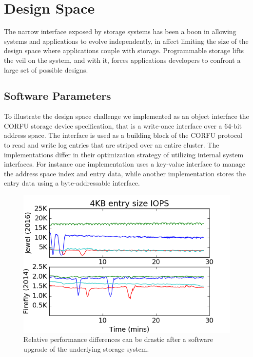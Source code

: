 \section{Design Space}
\label{sec:dspace}

The narrow interface exposed by storage systems has been a boon in allowing
systems and applications to evolve independently, in affect limiting the size
of the design space where applications couple with storage. Programmable
storage lifts the veil on the system, and with it, forces applications developers
to confront a large set of possible designs.

\subsection{Software Parameters}

To illustrate the design space challenge we implemented as an object interface
the CORFU storage device specification, that is a write-once interface over a
64-bit address space. The interface is used as a building block of the CORFU
protocol to read and write log entries that are striped over an entire
cluster.  The implementations differ in their optimization strategy of
utilizing internal system interfaces. For instance one implementation uses a
key-value interface to manage the address space index and entry data, while
another implementation stores the entry data using a byte-addressable
interface.

\begin{figure}[t]
\centering
\includegraphics[width=1.0\linewidth]{jewel_v_firefly_pd.png}
\caption{Relative performance differences can be drastic after a software
    upgrade of the underlying storage system.}
\label{fig:phy-design}
\end{figure}


